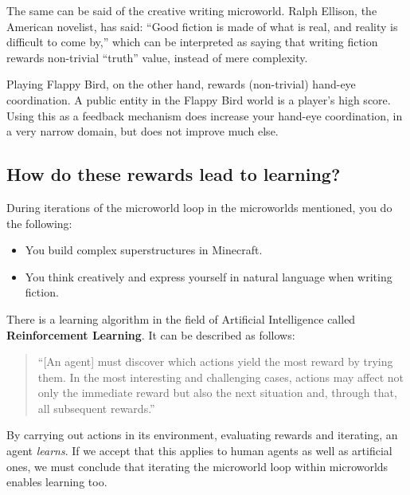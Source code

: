 The same can be said of the creative writing microworld. Ralph Ellison, the American novelist, has said: ``Good
fiction is made of what is real, and reality is difficult to come by,''
which can be interpreted as saying that writing fiction rewards non-trivial ``truth'' value, instead of mere complexity.

Playing Flappy Bird, on the other hand, rewards (non-trivial) hand-eye coordination. A public entity in the
Flappy Bird world is a player's high score. Using this as a
feedback mechanism does increase your hand-eye coordination, in a very narrow domain,
but does not improve much else. 

\subsection{How do these rewards lead to learning?}

During iterations of the microworld loop in the microworlds mentioned, you do the following:

\begin{itemize}

\item You build complex superstructures in Minecraft\cite{local:minecraft}.
\item You think creatively and express yourself in natural language when writing fiction\cite{neural}.

\end{itemize}

There is a learning algorithm in the field of Artificial Intelligence called \textbf{Reinforcement Learning}. It can be described as follows:

\begin{quote}
``[An agent] must discover which actions yield the most reward by trying them. In the most interesting and challenging cases, actions may affect not only the immediate reward but also the next situation and, through that, all subsequent rewards.''\cite{reinforcement}
\end{quote}

By carrying out actions in its environment, evaluating rewards and iterating, an agent \emph{learns}. If we accept that this applies to human agents as well as artificial ones, we must conclude that iterating the microworld loop within microworlds enables learning too.
